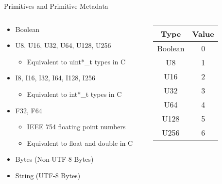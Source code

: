 \documentclass{beamer}
\begin{document}
\begin{frame}{Primitives and Primitive Metadata}
	\begin{columns}
		\begin{column}{0.5\textwidth}
			\begin{itemize}
				\item Boolean
				\item U8, U16, U32, U64, U128, U256
				      \begin{itemize}
					      \item Equivalent to uint*\_t types in C
				      \end{itemize}
				\item I8, I16, I32, I64, I128, I256
				      \begin{itemize}
					      \item Equivalent to int*\_t types in C
				      \end{itemize}
				\item F32, F64
				      \begin{itemize}
					      \item IEEE 754 floating point numbers
					      \item Equivalent to float and double in C
				      \end{itemize}
				\item Bytes  (Non-UTF-8 Bytes)
				\item String (UTF-8 Bytes)
			\end{itemize}
		\end{column}
		\begin{column}{0.25\textwidth}
			\center
			\begin{tabular}{|c|c|}
				\hline
				\textbf{Type} & \textbf{Value} \\
				\hline
				Boolean       & 0              \\
				U8            & 1              \\
				U16           & 2              \\
				U32           & 3              \\
				U64           & 4              \\
				U128          & 5              \\
				U256          & 6              \\
				\hline
			\end{tabular}
		\end{column}
		\begin{column}{0.25\textwidth}
			\center
			\begin{tabular}{|c|c|}

\end{tabular}
\end{column}
\end{columns}
\end{frame}
\end{document}
